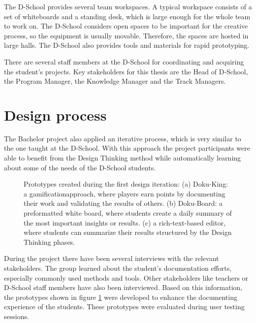 The D-School provides several team workspaces. A typical workspace consists of a set of whiteboards and a standing desk, which is large enough for the whole team to work on. The D-School considers open spaces to be important for the creative process, so the equipment is usually movable. Therefore, the spaces are hosted in large halls. The D-School also provides tools and materials for rapid prototyping.

There are several staff members at the D-School for coordinating and acquiring the student's projects. Key stakeholders for this thesis are the Head of D-School, the Program Manager, the Knowledge Manager and the Track Managers.

\section{Design process}
The Bachelor project also applied an iterative process, which is very similar to the one taught at the D-School. With this approach the project participants were able to benefit from the Design Thinking method while automatically learning about some of the needs of the D-School students.

\begin{figure}
\caption[Prototypes created during the first design iteration]{Prototypes created during the first design iteration: (a) Doku-King: a gamification\footnotemark approach, where players earn points by documenting their work and validating the results of others. \quad (b) Doku-Board: a preformatted white board, where students create a daily summary of the most important insights or results. \quad (c) a rich-text-based editor, where students can summarize their results structured by the Design Thinking phases.}
\label{fig:First_prototypes}
\end{figure}


During the project there have been several interviews with the relevant stakeholders. The group learned about the student's documentation efforts, especially commonly used methods and tools. Other stakeholders like teachers or D-School staff members have also been interviewed. Based on this information, the prototypes shown in figure \ref{fig:First_prototypes} were developed to enhance the documenting experience of the students. These prototypes were evaluated during user testing sessions.

